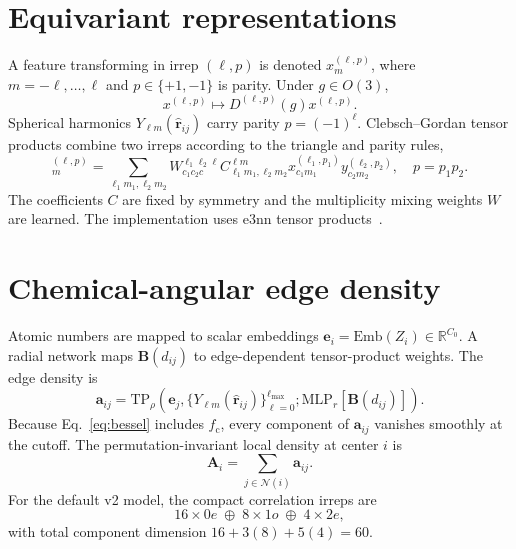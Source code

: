 \documentclass[10pt]{article}
\newcommand{\R}{\mathbb{R}}
\newcommand{\calN}{\mathcal{N}}
\newcommand{\vect}[1]{\bm{#1}}
\begin{document}
\section{Equivariant representations}

A feature transforming in irrep $(\ell,p)$ is denoted
$x^{(\ell,p)}_m$, where $m=-\ell,\ldots,\ell$ and $p\in\{+1,-1\}$
is parity. Under $g\in O(3)$,
\begin{equation}
 x^{(\ell,p)}\mapsto D^{(\ell,p)}(g)x^{(\ell,p)}.
\end{equation}
Spherical harmonics $Y_{\ell m}(\widehat{\vect r}_{ij})$ carry parity
$p=(-1)^\ell$. Clebsch--Gordan tensor products combine two irreps according to
the triangle and parity rules,
\begin{equation}
 [x\otimes_{\mathrm{CG}}y]^{(\ell,p)}_m
 =\sum_{\ell_1m_1,\ell_2m_2}
 W^{\ell_1\ell_2\ell}_{c_1c_2c}
 C^{\ell m}_{\ell_1m_1,\ell_2m_2}
 x^{(\ell_1,p_1)}_{c_1m_1}y^{(\ell_2,p_2)}_{c_2m_2},
 \quad p=p_1p_2.
 \label{eq:cg}
\end{equation}
The coefficients $C$ are fixed by symmetry and the multiplicity mixing weights
$W$ are learned. The implementation uses e3nn tensor products~\cite{geiger2022}.

\section{Chemical-angular edge density}

Atomic numbers are mapped to scalar embeddings
$\vect e_i=\mathrm{Emb}(Z_i)\in\R^{C_0}$. A radial network maps
$\vect B(d_{ij})$ to edge-dependent tensor-product weights. The edge density is
\begin{equation}
 \vect a_{ij}=
 \mathrm{TP}_{\rho}\!\left(
   \vect e_j,
   \{Y_{\ell m}(\widehat{\vect r}_{ij})\}_{\ell=0}^{\ell_{\max}};
   \mathrm{MLP}_{r}[\vect B(d_{ij})]
 \right).
 \label{eq:edge-density}
\end{equation}
Because Eq.~\eqref{eq:bessel} includes $f_{\mathrm c}$, every component of
$\vect a_{ij}$ vanishes smoothly at the cutoff. The permutation-invariant local
density at center $i$ is
\begin{equation}
 \vect A_i=\sum_{j\in\calN(i)}\vect a_{ij}.
 \label{eq:density}
\end{equation}
For the default v2 model, the compact correlation irreps are
\begin{equation}
 16\times0e\;\oplus\;8\times1o\;\oplus\;4\times2e,
 \label{eq:corr-irreps}
\end{equation}
with total component dimension $16+3(8)+5(4)=60$.
\end{document}
